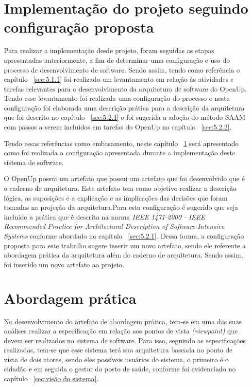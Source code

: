 %


\section{Implementação do projeto seguindo configuração proposta}
\label{sec:implementação}
Para realizar a implementação desde projeto, foram seguidas as etapas apresentadas anteriormente, a fim de determinar uma configuração e uso do processo de desenvolvimento de software.
Sendo assim, tendo como referência o capítulo  ~\ref{sec:5.1.1} foi realizado um levantamento em relação às atividades e tarefas relevantes para o desenvolvimento da arquitetura de software do \acrfull{OpenUp}. Tendo esse levantamento foi realizada uma configuração do processo e nesta configuração foi elaborada uma descrição prática para a descrição da arquitetura que foi descrito no capítulo ~\ref{sec:5.2.1} e foi sugerida a adoção do método \acrfull{SAAM} com passos a serem incluídos em tarefas do \acrfull{OpenUp} no capítulo ~\ref{sec:5.2.2}. 

Tendo essas referências como embasamento, neste capítulo ~\ref{sec:implementação} será apresentado como foi realizada a configuração apresentada durante a implementação deste sistema de software.

O \acrfull{OpenUp} possui um artefato que possui um artefato que foi desenvolvido que é o caderno de arquitetura. Este artefato tem como objetivo realizar a descrição lógica, as suposições e a explicação e as implicações das decisões que foram tomadas na projeção da arquitetura\cite{openup}.Para esta configuração é sugerido que seja incluído a prática que é descrita na norma \emph{IEEE 1471-2000 - IEEE Recommended Practice for Architectural Description of Software-Intensive Systems} conforme abordado no capítulo ~\ref{sec:5.2.1}. Dessa forma, a configuração proposta para este trabalho sugere inserir um novo artefato, sendo ele referente a abordagem prática da arquitetura além do caderno de arquitetura. Sendo assim, foi inserido um novo artefato ao projeto.

\section{Abordagem prática}
No desenvolvimento do artefato de abordagem prática, tem-se em uma das suas análises realizar a especificação em relação aos pontos de vista \emph{(viewpoint)} que devem ser realizados no sistema de software. Para isso, seguindo as especificações realizadas, tem-se que esse sistema terá sua arquitetura baseada no ponto de vista de dois atores, sendo eles possíveis usuários do sistema, o primeiro é o cidadão e em seguida o gestor do posto de saúde, conforme foi evidenciado no capítulo  ~\ref{sec:visão do sistema}.

